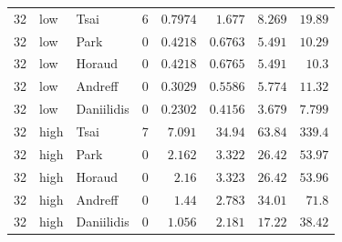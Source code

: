 \begin{longtable}{rllrrrrr}
32 & low & Tsai & 6 & $0.7974$ & $1.677$ & $8.269$ & $19.89$ \\
32 & low & Park & 0 & $0.4218$ & $0.6763$ & $5.491$ & $10.29$ \\
32 & low & Horaud & 0 & $0.4218$ & $0.6765$ & $5.491$ & $10.3$ \\
32 & low & Andreff & 0 & $0.3029$ & $0.5586$ & $5.774$ & $11.32$ \\
32 & low & Daniilidis & 0 & $0.2302$ & $0.4156$ & $3.679$ & $7.799$ \\
32 & high & Tsai & 7 & $7.091$ & $34.94$ & $63.84$ & $339.4$ \\
32 & high & Park & 0 & $2.162$ & $3.322$ & $26.42$ & $53.97$ \\
32 & high & Horaud & 0 & $2.16$ & $3.323$ & $26.42$ & $53.96$ \\
32 & high & Andreff & 0 & $1.44$ & $2.783$ & $34.01$ & $71.8$ \\
32 & high & Daniilidis & 0 & $1.056$ & $2.181$ & $17.22$ & $38.42$ \\
\end{longtable}
\endgroup
